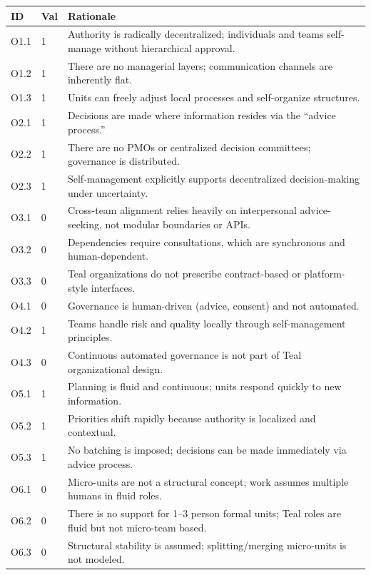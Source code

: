 \documentclass[11pt, a4paper, twocolumn]{article} %
\begin{document}
\begin{table}[h]
\centering
\begingroup\small
\setlength{\tabcolsep}{4pt}%
\begin{tabularx}{\linewidth}{llX}
\toprule
\textbf{ID} & \textbf{Val} & \textbf{Rationale} \\
\midrule
O1.1 & 1 &
Authority is radically decentralized; individuals and teams self-manage without hierarchical approval. \\
O1.2 & 1 &
There are no managerial layers; communication channels are inherently flat. \\
O1.3 & 1 &
Units can freely adjust local processes and self-organize structures. \\
\midrule
O2.1 & 1 &
Decisions are made where information resides via the “advice process.” \\
O2.2 & 1 &
There are no PMOs or centralized decision committees; governance is distributed. \\
O2.3 & 1 &
Self-management explicitly supports decentralized decision-making under uncertainty. \\
\midrule
O3.1 & 0 &
Cross-team alignment relies heavily on interpersonal advice-seeking, not modular boundaries or APIs. \\
O3.2 & 0 &
Dependencies require consultations, which are synchronous and human-dependent. \\
O3.3 & 0 &
Teal organizations do not prescribe contract-based or platform-style interfaces. \\
\midrule
O4.1 & 0 &
Governance is human-driven (advice, consent) and not automated. \\
O4.2 & 1 &
Teams handle risk and quality locally through self-management principles. \\
O4.3 & 0 &
Continuous automated governance is not part of Teal organizational design. \\
\midrule
O5.1 & 1 &
Planning is fluid and continuous; units respond quickly to new information. \\
O5.2 & 1 &
Priorities shift rapidly because authority is localized and contextual. \\
O5.3 & 1 &
No batching is imposed; decisions can be made immediately via advice process. \\
\midrule
O6.1 & 0 &
Micro-units are not a structural concept; work assumes multiple humans in fluid roles. \\
O6.2 & 0 &
There is no support for 1--3 person formal units; Teal roles are fluid but not micro-team based. \\
O6.3 & 0 &
Structural stability is assumed; splitting/merging micro-units is not modeled. \\
\bottomrule
\end{tabularx}
\endgroup
\end{table}
\end{document}
